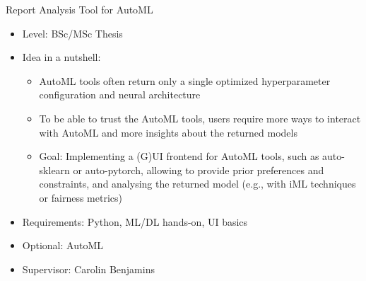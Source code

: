 \documentclass[aspectratio=169]{../latex_main/tntbeamer}  %
\begin{document}
\begin{frame}[c]{Report Analysis Tool for AutoML}
 
	\begin{itemize}
		\item Level: BSc/MSc Thesis
		\item Idea in a nutshell:
		\begin{itemize}
		    \item AutoML tools often return only a single optimized hyperparameter configuration and neural architecture
		    \item To be able to trust the AutoML tools, users require more ways to interact with AutoML and more insights about the returned models
		    \item Goal: Implementing a (G)UI frontend for AutoML tools, such as auto-sklearn or auto-pytorch, allowing to provide prior preferences and constraints, and analysing the returned model (e.g., with iML techniques or fairness metrics)
		\end{itemize}
		\item Requirements: Python, ML/DL hands-on, UI basics
		\item Optional: AutoML
		\item Supervisor: Carolin Benjamins
	\end{itemize}
\end{frame}
\end{document}
